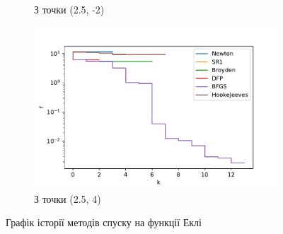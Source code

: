 \begin{figure}[h!]
\begin{subfigure}{0.5\textwidth}
        \caption{З точки (2.5, -2)}
    \end{subfigure}
    \begin{subfigure}{0.5\textwidth}
        \includegraphics[width=\textwidth, trim=0cm 0cm 1.2cm 1cm, clip]{assets/descent_steps/ackley_steps_3.pdf}
        \caption{З точки (2.5, 4)}
    \end{subfigure}
    \caption{Графік історії методів спуску на функції Еклі}
\end{figure}
